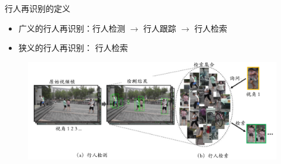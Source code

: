 \documentclass[usenames,dvipsnames,notes]{beamer}
\begin{document}
\begin{frame}
	{行人再识别的定义}
	\begin{itemize}
		\item 广义的行人再识别：行人检测 $\rightarrow$ 行人跟踪 $\rightarrow$ 行人检索
		\item 狭义的行人再识别\cite{zheng2016person}： 行人检索
	\end{itemize}
	\begin{figure}
		\includegraphics[width=1\linewidth]{fig/background.pdf}
	\end{figure}
\end{frame}
\end{document}
